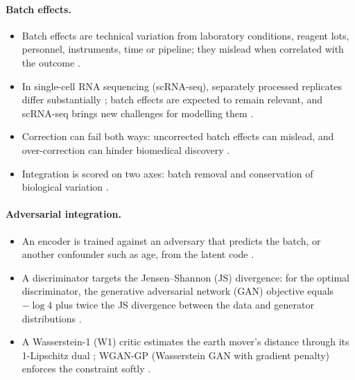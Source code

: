 \documentclass[11pt]{article}
\begin{document}
\paragraph{Batch effects.}
\begin{itemize}
\item Batch effects are technical variation from laboratory conditions, reagent lots, personnel, instruments, time or pipeline; they mislead when correlated with the outcome \citep{leek2010tackling,yu2024assessing}.
\item In single-cell RNA sequencing (scRNA-seq), separately processed replicates differ substantially \citep{tung2017batch}; batch effects are expected to remain relevant, and scRNA-seq brings new challenges for modelling them \citep{goh2022batch}.
\item Correction can fail both ways: uncorrected batch effects can mislead, and over-correction can hinder biomedical discovery \citep{yu2024assessing}.
\item Integration is scored on two axes: batch removal and conservation of biological variation \citep{luecken2022benchmarking}.
\end{itemize}

\paragraph{Adversarial integration.}
\begin{itemize}
\item An encoder is trained against an adversary that predicts the batch, or another confounder such as age, from the latent code \citep{ganin2016domain,dincer2020adversarial}.
\item A discriminator targets the Jensen--Shannon (JS) divergence: for the optimal discriminator, the generative adversarial network (GAN) objective equals $-\log 4$ plus twice the JS divergence between the data and generator distributions \citep[Sec.~4.1, Eq.~6, in the proof of Thm.~1]{goodfellow2014generative}.
\item A Wasserstein-1 (W1) critic estimates the earth mover's distance through its 1-Lipschitz dual \citep{arjovsky2017wasserstein}; WGAN-GP (Wasserstein GAN with gradient penalty) enforces the constraint softly \citep[Sec.~4]{gulrajani2017improved}.
\end{itemize}
\end{document}
